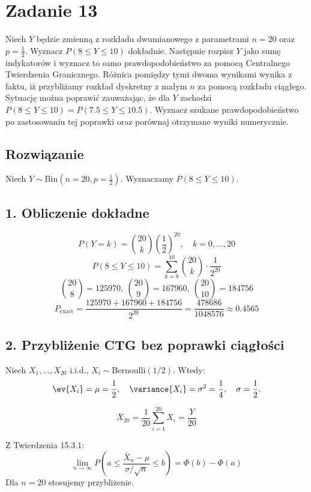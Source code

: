 \section{Zadanie 13}
Niech \( Y \) będzie zmienną z rozkładu dwumianowego z parametrami \( n = 20 \) oraz \( p = \frac{1}{2} \).
Wyznacz \( P(8 \leq Y \leq 10) \) dokładnie.
Następnie rozpisz \( Y \) jako sumę indykatorów i wyznacz to samo prawdopodobieństwo
za pomocą Centralnego Twierdzenia Granicznego.
Różnica pomiędzy tymi dwoma wynikami wynika z faktu, iż przybliżamy rozkład dyskretny
z małym \( n \) za pomocą rozkładu ciągłego.
Sytuację można poprawić zauważając, że dla \( Y \) zachodzi
\( P(8 \leq Y \leq 10) = P(7.5 \leq Y \leq 10.5) \).
Wyznacz szukane prawdopodobieństwo po zastosowaniu tej poprawki oraz porównaj otrzymane wyniki numerycznie.

\subsection*{Rozwiązanie}

Niech \( Y \sim \mathrm{Bin}\left(n=20, p=\frac12\right) \). Wyznaczamy \( P(8 \le Y \le 10) \).

\subsection*{1. Obliczenie dokładne}
\[
	P(Y=k) = \binom{20}{k} \left(\frac12\right)^{20}, \quad k=0,\dots,20
\]
\[
	P(8 \le Y \le 10) = \sum_{k=8}^{10} \binom{20}{k} \cdot \frac{1}{2^{20}}
\]
\[
	\binom{20}{8}=125970,\ \binom{20}{9}=167960,\ \binom{20}{10}=184756
\]
\[
	P_{\text{exact}} = \frac{125970+167960+184756}{2^{20}} = \frac{478686}{1048576} \approx 0.4565
\]

\subsection*{2. Przybliżenie CTG bez poprawki ciągłości}

Niech \( X_1,\dots,X_{20} \) i.i.d., \( X_i \sim \mathrm{Bernoulli}(1/2) \).
Wtedy:
\[
	\ev{X_i} = \mu = \frac12,\quad
	\variance{X_i} = \sigma^2 = \frac14,\quad
	\sigma = \frac12.
\]

\[
	\bar{X}_{20} = \frac{1}{20}\sum_{i=1}^{20} X_i = \frac{Y}{20}
\]

Z Twierdzenia 15.3.1:
\[
	\lim_{n\to\infty} P\!\left( a \le \frac{\bar{X}_n-\mu}{\sigma/\sqrt{n}} \le b \right) = \Phi(b)-\Phi(a)
\]
Dla \( n=20 \) stosujemy przybliżenie.

